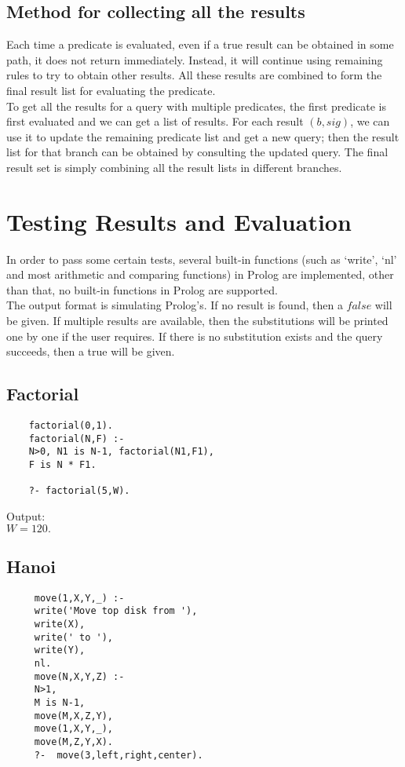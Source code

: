 \documentclass[11pt,a4paper]{report}
\begin{document}
\subsection*{Method for collecting all the results}
Each time a predicate is evaluated, even if a true result can be obtained in some path, it does not return immediately. Instead, it will continue using remaining rules to try to obtain other results. All these results are combined to form the final result list for evaluating the predicate.\\
To get all the results for a query with multiple predicates, the first predicate is first evaluated and we can get a list of results. For each result $(b,sig)$, we can use it to update the remaining predicate list and get a new query; then the result list for that branch can be obtained by consulting the updated query. The final result set is simply combining all the result lists in different branches. 


\section*{Testing Results and Evaluation}
In order to pass some certain tests, several built-in functions (such as `write', `nl' and most arithmetic and comparing functions) in Prolog are implemented, other than that, no built-in functions in Prolog are supported.\\

The output format is simulating Prolog's. If no result is found, then a $false$ will be given.
If multiple results are available, then the substitutions will be printed one by one if the user requires. If there is no substitution exists and the query succeeds, then a true will be given.

\subsection*{Factorial}
\begin{lstlisting}
	factorial(0,1). 
	factorial(N,F) :- 
	N>0, N1 is N-1, factorial(N1,F1),
	F is N * F1. 
	
	?- factorial(5,W).
\end{lstlisting}
Output:\\
$W=120.$


\subsection*{Hanoi}
\begin{lstlisting}
	 move(1,X,Y,_) :-  
	 write('Move top disk from '), 
	 write(X), 
	 write(' to '), 
	 write(Y), 
	 nl. 
	 move(N,X,Y,Z) :- 
	 N>1, 
	 M is N-1, 
	 move(M,X,Z,Y), 
	 move(1,X,Y,_), 
	 move(M,Z,Y,X).  
	 ?-  move(3,left,right,center). 
\end{lstlisting}
\end{document}
